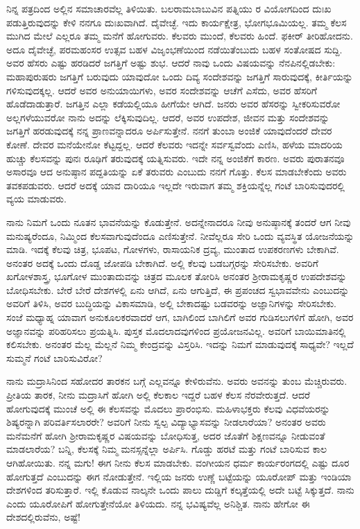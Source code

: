 ನಿನ್ನ ಪತ್ರದಿಂದ ಅಲ್ಲಿನ ಸಮಾಚಾರವೆಲ್ಲ ತಿಳಿಯಿತು. ಬಲರಾಮಬಾಬುವಿನ ಪತ್ನಿಯು\enginline{-} ರ ವಿಯೋಗದಿಂದ ದುಃಖ ಪಡುತ್ತಿರುವುದನ್ನು ಕೇಳಿ ನನಗೂ ದುಃಖವಾಗಿದೆ. ದೈವೇಚ್ಛೆ. ಇದು ಕಾರ್ಯಕ್ಷೇತ್ರ, ಭೋಗಭೂಮಿಯಲ್ಲ. ತಮ್ಮ ಕೆಲಸ ಮುಗಿದ ಮೇಲೆ ಎಲ್ಲರೂ ತಮ್ಮ ಮನೆಗೆ ಹೋಗುವರು. ಕೆಲವರು ಮುಂದೆ, ಕೆಲವರು ಹಿಂದೆ. ಫಕೀರ್ ತೀರಿಹೋದನು. ಅದೂ ದೈವೇಚ್ಛೆ, ಪರಮಹಂಸರ ಉತ್ಸವ ಬಹಳ ವಿಜೃಂಭಣೆಯಿಂದ ನಡೆಯಿತೆಂಬುದು ಬಹಳ ಸಂತೋಷದ ಸುದ್ದಿ. ಅವರ ಹೆಸರು ಎಷ್ಟು ಹರಡಿದರೆ ಜಗತ್ತಿಗೆ ಅಷ್ಟು ಶುಭ. ಆದರೆ ನಾವು ಒಂದು ವಿಷಯವನ್ನು ನೆನಪಿನಲ್ಲಿಡಬೇಕು: ಮಹಾಪುರುಷರು ಜಗತ್ತಿಗೆ ಬರುವುದು ಯಾವುದೋ ಒಂದು ದಿವ್ಯ ಸಂದೇಶವನ್ನು ಜಗತ್ತಿಗೆ ಸಾರುವುದಕ್ಕೆ, ಕೀರ್ತಿಯನ್ನು ಗಳಿಸುವುದಕ್ಕಲ್ಲ. ಆದರೆ ಅವರ ಅನುಯಾಯಿಗಳು, ಅವರ ಸಂದೇಶವನ್ನು ಆಚೆಗೆ ಎಸೆದು, ಅವರ ಹೆಸರಿಗೆ ಹೊಡೆದಾಡುತ್ತಾರೆ. ಜಗತ್ತಿನ ಎಲ್ಲಾ ಕಡೆಯಲ್ಲಿಯೂ ಹೀಗೆಯೇ ಆಗಿದೆ. ಜನರು ಅವರ ಹೆಸರನ್ನು ಸ್ವೀಕರಿಸುವರೋ ಅಲ್ಲಗಳೆಯುವರೋ ನಾನು ಅದನ್ನು ಲೆಕ್ಕಿಸುವುದಿಲ್ಲ. ಆದರೆ, ಅವರ ಉಪದೇಶ, ಜೀವನ ಮತ್ತು ಸಂದೇಶವನ್ನು ಜಗತ್ತಿಗೆ ಹರಡುವುದಕ್ಕೆ ನನ್ನ ಪ್ರಾಣವನ್ನಾದರೂ ಅರ್ಪಿಸುತ್ತೇನೆ. ನನಗೆ ತುಂಬಾ ಅಂಜಿಕೆ ಯಾವುದೆಂದರೆ ದೇವರ ಕೋಣೆ. ದೇವರ ಮನೆಯೇನೋ ಕೆಟ್ಟದ್ದಲ್ಲ. ಆದರೆ ಕೆಲವರು ಇದನ್ನೇ ಸರ್ವಸ್ವವೆಂದು ಎಣಿಸಿ, ಹಳೆಯ ಮಾದರಿಯ ಹುಚ್ಚು ಕೆಲಸವನ್ನು ಪುನಃ ರೂಢಿಗೆ ತರುವುದಕ್ಕೆ ಯತ್ನಿಸುವರು. ಇದೇ ನನ್ನ ಅಂಜಿಕೆಗೆ ಕಾರಣ. ಅವರು ಪುರಾತನವೂ ಅಸಾರವೂ ಆದ ಅನುಷ್ಠಾನ ಪದ್ದತಿಯನ್ನು ಏಕೆ ತರುವರು ಎಂಬುದು ನನಗೆ ಗೊತ್ತು. ಕೆಲಸ ಮಾಡಬೇಕೆಂದು ಅವರು ತವಕಪಡುವರು. ಆದರೆ ಅದಕ್ಕೆ ಯಾವ ದಾರಿಯೂ ಇಲ್ಲದೇ ಇರುವಾಗ ತಮ್ಮ ಶಕ್ತಿಯನ್ನೆಲ್ಲ ಗಂಟೆ ಬಾರಿಸುವುದರಲ್ಲಿ ವ್ಯಯ ಮಾಡುವರು.

ನಾನು ನಿಮಗೆ ಒಂದು ನೂತನ ಭಾವನೆಯನ್ನು ಕೊಡುತ್ತೇನೆ. ಅದನ್ನೇನಾದರೂ ನೀವು ಅನುಷ್ಠಾನಕ್ಕೆ ತಂದರೆ ಆಗ ನೀವು ಮನುಷ್ಯರೆಂದೂ, ನಿಮ್ಮಿಂದ ಕೆಲಸವಾಗುವುದೆಂದೂ ಎಣಿಸುತ್ತೇನೆ. ನೀವೆಲ್ಲರೂ ಸೇರಿ ಒಂದು ವ್ಯವಸ್ಥಿತ ಯೋಜನೆಯನ್ನು ಮಾಡಿ. ಇದಕ್ಕೆ ಕೆಲವು ಚಿತ್ರ, ಭೂಪಟ, ಗೋಳಗಳು, ರಾಸಾಯನಿಕ ದ್ರವ್ಯ, ಮುಂತಾದ ಉಪಕರಣಗಳು ಬೇಕಾಗಿವೆ. ಅನಂತರ ಅದಕ್ಕೆ ಒಂದು ದೊಡ್ಡ ಜೋಪಡಿ ಬೇಕಾಗಿದೆ. ಅಲ್ಲಿ ಕೆಲವು ಬಡಬಗ್ಗರನ್ನು ಸೇರಿಸಬೇಕು. ಅವರಿಗೆ ಖಗೋಳಶಾಸ್ತ್ರ, ಭೂಗೋಳ ಮುಂತಾದುವನ್ನು ಚಿತ್ರದ ಮೂಲಕ ತೋರಿಸಿ ಅನಂತರ ಶ‍್ರೀರಾಮಕೃಷ್ಣರ ಉಪದೇಶವನ್ನು ಬೋಧಿಸಬೇಕು. ಬೇರೆ ಬೇರೆ ದೇಶಗಳಲ್ಲಿ ಏನು ಆಗಿದೆ, ಏನು ಆಗುತ್ತಿದೆ, ಈ ಪ್ರಪಂಚದ ಸ್ವಭಾವವೇನು ಎಂಬುದನ್ನು ಅವರಿಗೆ ತಿಳಿಸಿ, ಅವರ ಬುದ್ಧಿಯನ್ನು ವಿಕಾಸಮಾಡಿ, ಅಲ್ಲಿ ಬೇಕಾದಷ್ಟು ಬಡವರನ್ನು ಅಜ್ಞಾನಿಗಳನ್ನು ಸೇರಿಸಬೇಕು. ಸಂಜೆ ಮಧ್ಯಾಹ್ನ ಯಾವಾಗ ಅನುಕೂಲಕರವಾದರೆ ಆಗ, ಬಾಗಿಲಿಂದ ಬಾಗಿಲಿಗೆ ಅವರ ಗುಡಿಸಲುಗಳಿಗೆ ಹೋಗಿ, ಅವರ ಅಜ್ಞಾನವನ್ನು ಪರಿಹರಿಸಲು ಪ್ರಯತ್ನಿಸಿ. ಪುಸ್ತಕ ಮೊದಲಾದವುಗಳಿಂದ ಪ್ರಯೋಜನವಿಲ್ಲ. ಅವರಿಗೆ ಬಾಯಿಮಾತಿನಲ್ಲಿ ಕಲಿಸಬೇಕು. ಅನಂತರ ಮೆಲ್ಲ ಮೆಲ್ಲನೆ ನಿಮ್ಮ ಕೇಂದ್ರವನ್ನು ವಿಸ್ತರಿಸಿ. ಇದನ್ನು ನಿಮಗೆ ಮಾಡುವುದಕ್ಕೆ ಸಾಧ್ಯವೇ? ಇಲ್ಲದೆ ಸುಮ್ಮನೆ ಗಂಟೆ ಬಾರಿಸುವಿರೋ?
\vspace{0.3cm}

ನಾನು ಮದ್ರಾಸಿನಿಂದ ಸಹೋದರ ತಾರಕನ ಬಗ್ಗೆ ಎಲ್ಲವನ್ನೂ ಕೇಳಿರುವೆನು. ಅವರು ಅವನನ್ನು ತುಂಬ ಮೆಚ್ಚಿರುವರು. ಪ್ರೀತಿಯ ತಾರಕ, ನೀನು ಮದ್ರಾಸಿಗೆ ಹೋಗಿ ಅಲ್ಲಿ ಕೆಲಕಾಲ ಇದ್ದರೆ ಬಹಳ ಕೆಲಸ ನೆರವೇರುತ್ತದೆ. ಆದರೆ ಹೋಗುವುದಕ್ಕೆ ಮುಂಚೆ ಅಲ್ಲಿ ಈ ಕೆಲಸವನ್ನು ಮೊದಲು ಪ್ರಾರಂಭಿಸು. ಮಹಿಳಾಭಕ್ತರು ಕೆಲವು ವಿಧವೆಯರನ್ನು ಶಿಷ್ಯರನ್ನಾಗಿ ಪರಿವರ್ತಿಸಲಾರರೇ? ಅವರಿಗೆ ನೀನು ಸ್ವಲ್ಪ ವಿದ್ಯಾಭ್ಯಾಸವನ್ನು ನೀಡಲಾರೆಯಾ? ಅನಂತರ ಅವರು ಮನೆಮನೆಗೆ ಹೋಗಿ ಶ‍್ರೀರಾಮಕೃಷ್ಣರ ವಿಷಯವನ್ನು ಬೋಧಿಸುತ್ತ, ಅದರ ಜೊತೆಗೆ ಶಿಕ್ಷಣವನ್ನೂ ನೀಡುವಂತೆ ಮಾಡಲಾರೆಯ? ಬನ್ನಿ, ಕೆಲಸಕ್ಕೆ ನಿಮ್ಮ ಮನಸ್ಸನ್ನೆಲ್ಲಾ ಅರ್ಪಿಸಿ. ಗೊಡ್ಡು ಹರಟೆ ಮತ್ತು ಗಂಟೆ ಬಾರಿಸುವ ಕಾಲ ಆಗಿಹೋಯಿತು. ನನ್ನ ಮಗು! ಈಗ ನೀನು ಕೆಲಸ ಮಾಡಬೇಕು. ವಂಗೀಯನ ಧರ್ಮ ಕಾರ್ಯರಂಗದಲ್ಲಿ ಎಷ್ಟು ದೂರ ಹೋಗುತ್ತದೆ ಎಂಬುದನ್ನು ಈಗ ನೋಡುತ್ತೇನೆ. ಇಲ್ಲಿಯ ಜನರು ಉಣ್ಣೆ ಬಟ್ಟೆಯನ್ನು ಯೂರೋಪ್ ಮತ್ತು ಇಂಡಿಯಾ ದೇಶಗಳಿಂದ ತರಿಸುತ್ತಾರೆ. ಇಲ್ಲಿ ಕೊಡುವ ನಾಲ್ಕನೇ ಒಂದು ಪಾಲು ದುಡ್ಡಿಗೆ ಕಲ್ಕತ್ತೆಯಲ್ಲಿ ಅದೇ ಬಟ್ಟೆ ಸಿಕ್ಕುತ್ತದೆ. ನಾನು ಎಂದು ಯೂರೋಪಿಗೆ ಹೋಗುತ್ತೇನೆಯೋ ತಿಳಿಯದು. ನನ್ನ ಭವಿಷ್ಯವೆಲ್ಲ ಅನಿಶ್ಚಿತ. ನಾನು ಹೇಗೋ ಈ ದೇಶದಲ್ಲಿರುವೆನು, ಅಷ್ಟೆ!
\vspace{0.2cm}

